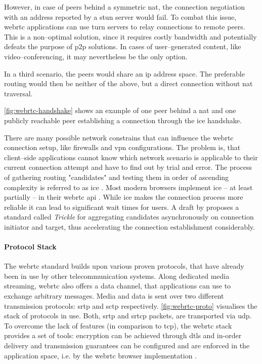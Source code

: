 However, in case of peers behind a symmetric \gls{nat}, the connection negotiation with an address reported by a \gls{stun} server would fail. To combat this issue, \gls{webrtc} applications can use \gls{turn} servers to relay connections to remote peers. This is a non–optimal solution, since it requires costly bandwidth and potentially defeats the purpose of \gls{p2p} solutions. In cases of user–generated content, like video–conferencing, it may nevertheless be the only option.

In a third scenario, the peers would share an \gls{ip} address space. The preferable routing would then be neither of the above, but a direct connection without \gls{nat} traversal.

\vref{fig:webrtc-handshake} shows an example of one peer behind a \gls{nat} and one publicly reachable peer establishing a connection through the \gls{ice} handshake.

There are many possible network constrains that can influence the \gls{webrtc} connection setup, like firewalls and \gls{vpn} configurations. The problem is, that client–side applications cannot know which network scenario is applicable to their current connection attempt and have to find out by trial and error. The process of gathering routing "candidates" and testing them in order of ascending complexity is referred to as \gls{ice} \cite{ice-rfc}. Most modern browsers implement \gls{ice} – at least partially – in their \gls{webrtc} \gls{api} \cite{webrtc-browser-compat}. While \gls{ice} makes the connection process more reliable it can lead to significant wait times for users. A draft by \citet{trickle-ice} proposes a standard called \textit{Trickle} for aggregating candidates asynchronously on connection initiator and target, thus accelerating the connection establishment considerably.

\paragraph{Protocol Stack}
The \gls{webrtc} standard builds upon various proven protocols, that have already been in use by other telecommunication systems. Along dedicated media streaming, \gls{webrtc} also offers a data channel, that applications can use to exchange arbitrary messages. Media and data is sent over two different transmission protocols: \gls{srtp} and \gls{sctp} respectively. \vref{fig:webrtc-proto} visualises the stack of protocols in use. Both, \gls{srtp} and \gls{srtcp} packets, are transported via \gls{udp}. To overcome the lack of features (in comparison to \gls{tcp}), the \gls{webrtc} stack provides a set of tools: encryption can be achieved through \gls{dtls} and in-order delivery and transmission guarantees can be configured and are enforced in the application space, i.e. by the \gls{webrtc} browser implementation \cite[p. 319]{high-performance-browser-networking}.

